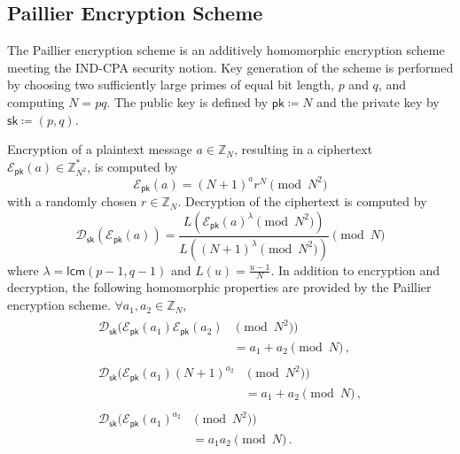 \documentclass[letterpaper, 10 pt, conference]{ieeeconf}
\begin{document}
\subsection{Paillier Encryption Scheme}\label{subsec:paillier}
The Paillier encryption scheme \cite{paillierPublicKeyCryptosystemsBased1999,katzIntroductionModernCryptography2008} is an additively homomorphic encryption scheme meeting the IND-CPA security notion. Key generation of the scheme is performed by choosing two sufficiently large primes of equal bit length, $p$ and $q$, and computing $N=pq$. The public key is defined by $\mathsf{pk} \coloneqq N$ and the private key by $\mathsf{sk} \coloneqq (p,q)$.

Encryption of a plaintext message $a \in \mathbb{Z}_N$, resulting in a ciphertext $\mathcal{E}_\mathsf{pk}(a) \in \mathbb{Z}^*_{N^2}$, is computed by
\begin{equation}
    \mathcal{E}_\mathsf{pk}(a) = (N+1)^a r^N \pmod{N^2}
\end{equation}
with a randomly chosen $r \in \mathbb{Z}_N$. Decryption of the ciphertext is computed by
\begin{equation}
    \mathcal{D}_\mathsf{sk}(\mathcal{E}_\mathsf{pk}(a)) = \frac{L\left(\mathcal{E}_\mathsf{pk}(a)^\lambda \pmod{N^2}\right)}{L\left((N+1)^\lambda \pmod{N^2}\right)}\pmod{N}
\end{equation}
where $\lambda = \mathsf{lcm}(p-1,q-1)$ and $L(u)=\frac{u-1}{N}$. In addition to encryption and decryption, the following homomorphic properties are provided by the Paillier encryption scheme. $\forall a_1,a_2 \in \mathbb{Z}_N$,
\begin{align}
    \begin{split}\label{eqn:paillier_add}
        \mathcal{D}_\mathsf{sk}(\mathcal{E}_\mathsf{pk}(a_1)\mathcal{E}_\mathsf{pk}(a_2) & \pmod{N^2})\\
        &= a_1+a_2 \pmod{N}\,,
    \end{split}\\
    \begin{split}\label{eqn:paillier_add_known}
        \mathcal{D}_\mathsf{sk}(\mathcal{E}_\mathsf{pk}(a_1)(N+1)^{a_2} & \pmod{N^2})\\
        &= a_1+a_2\pmod{N}\,,
    \end{split}\\
    \begin{split}
        \mathcal{D}_\mathsf{sk}(\mathcal{E}_\mathsf{pk}(a_1)^{a_2} & \pmod{N^2})\\
        &= a_1a_2 \pmod{N}\,.
    \end{split}
\end{align}
\end{document}
